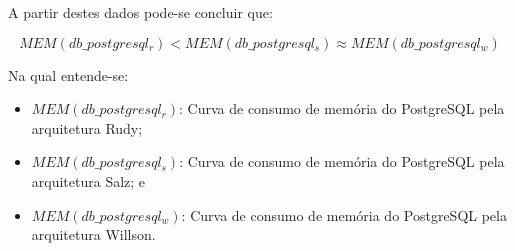 A partir destes dados pode-se concluir que:

$$
    MEM(db\_postgresql_{r}) < MEM(db\_postgresql_{s}) \approx MEM(db\_postgresql_{w})
$$

Na qual entende-se:

\begin{itemize}
\item $MEM(db\_postgresql_{r})$: Curva de consumo de memória do PostgreSQL pela arquitetura Rudy;
\item $MEM(db\_postgresql_{s})$: Curva de consumo de memória do PostgreSQL pela arquitetura Salz; e
\item $MEM(db\_postgresql_{w})$: Curva de consumo de memória do PostgreSQL pela arquitetura Willson.
\end{itemize}

